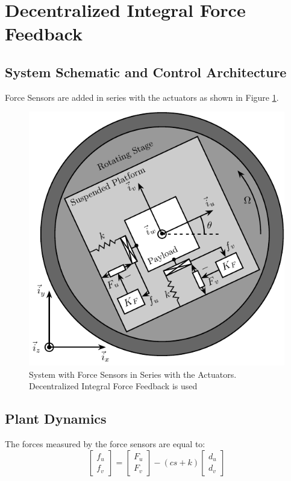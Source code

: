 \documentclass{ISMA_USD2020}
\begin{document}
\section{Decentralized Integral Force Feedback}
\label{sec:orgda38ad7}
\subsection{System Schematic and Control Architecture}
\label{sec:orgf08eb9d}

Force Sensors are added in series with the actuators as shown in Figure \ref{fig:system_iff}.

\begin{figure}[htbp]
\centering
\includegraphics[scale=1]{figs/system_iff.pdf}
\caption{\label{fig:system_iff}System with Force Sensors in Series with the Actuators. Decentralized Integral Force Feedback is used}
\end{figure}

\subsection{Plant Dynamics}
\label{sec:orgf2f22c2}
The forces measured by the force sensors are equal to:
\begin{equation}
\label{eq:measured_force}
  \begin{bmatrix} f_{u} \\ f_{v} \end{bmatrix} =
  \begin{bmatrix} F_u \\ F_v \end{bmatrix} - (c s + k)
  \begin{bmatrix} d_u \\ d_v \end{bmatrix}
\end{equation}
\end{document}
